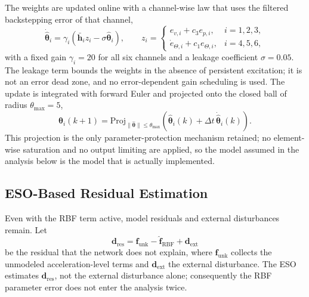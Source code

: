 \documentclass[Review,sageh,times]{sagej}
\begin{document}
The weights are updated online with a channel-wise law that uses the
filtered backstepping error of that channel,
\begin{equation}
\dot{\hat{\boldsymbol{\theta}}}_i =
\gamma_i\left(\bar{\mathbf{h}}_i z_i - \sigma\hat{\boldsymbol{\theta}}_i\right),
\qquad
z_i =
\begin{cases}
e_{v,i} + c_3 e_{p,i}, & i=1,2,3,\\[1mm]
\dot e_{\Theta,i} + c_1 e_{\Theta,i}, & i=4,5,6,
\end{cases}
\label{eq:adaptlaw}
\end{equation}
with a fixed gain $\gamma_i=20$ for all six channels and a leakage
coefficient $\sigma=0.05$. The leakage term bounds the weights in the
absence of persistent excitation; it is not an error dead zone, and no
error-dependent gain scheduling is used. The update is integrated with
forward Euler and projected onto the closed ball of radius $\theta_{\max}=5$,
\begin{equation}
\hat{\boldsymbol{\theta}}_i(k+1) =
\mathrm{Proj}_{\|\hat{\boldsymbol{\theta}}\|\le\theta_{\max}}
\left(
\hat{\boldsymbol{\theta}}_i(k) + \Delta t\,\dot{\hat{\boldsymbol{\theta}}}_i(k)
\right).
\label{eq:proj}
\end{equation}
This projection is the only parameter-protection mechanism retained; no
element-wise saturation and no output limiting are applied, so the model
assumed in the analysis below is the model that is actually implemented.

\subsection*{ESO-Based Residual Estimation}

Even with the RBF term active, model residuals and external disturbances
remain. Let
\begin{equation}
\mathbf{d}_{\mathrm{res}} = \mathbf{f}_{\mathrm{unk}} - \hat{\mathbf{f}}_{\mathrm{RBF}} + \mathbf{d}_{\mathrm{ext}}
\label{eq:residual}
\end{equation}
be the residual that the network does not explain, where
$\mathbf{f}_{\mathrm{unk}}$ collects the unmodeled acceleration-level terms and
$\mathbf{d}_{\mathrm{ext}}$ the external disturbance. The ESO estimates
$\mathbf{d}_{\mathrm{res}}$, not the external disturbance alone; consequently the
RBF parameter error does not enter the analysis twice.
\end{document}
